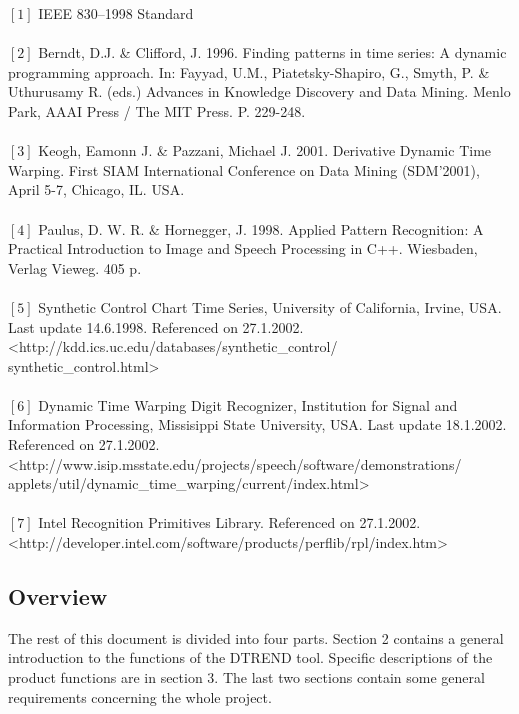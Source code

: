 \documentclass[a4paper,11pt]{article}
\begin{document}
$[1]$ IEEE 830--1998 Standard \\
\\
$[2]$ Berndt, D.J. \& Clifford, J. 1996. Finding patterns in time series: A dynamic programming approach. 
In: Fayyad, U.M., Piatetsky-Shapiro, G., Smyth, P. \& Uthurusamy R. (eds.) Advances in Knowledge Discovery
and Data Mining. Menlo Park, AAAI Press / The MIT Press. P. 229-248. \\
\\
$[3]$ Keogh, Eamonn J. \& Pazzani, Michael J. 2001. Derivative Dynamic Time Warping. First {SIAM} International 
Conference on Data Mining {(SDM'2001)}, April 5-7, Chicago, {IL}. {USA}. \\
\\
$[4]$ Paulus, D. W. R. \& Hornegger, J. 1998. Applied Pattern Recognition: A Practical Introduction to Image and
Speech Processing in C++. Wiesbaden, Verlag Vieweg. 405 p. \\
\\
$[5]$ Synthetic Control Chart Time Series, University of California, Irvine, {USA}. Last update 14.6.1998. Referenced
on 27.1.2002. \\
<http://kdd.ics.uc.edu/databases/synthetic\_control/\\synthetic\_control.html> \\
\\
$[6]$ Dynamic Time Warping Digit Recognizer, Institution for Signal and Information Processing, Missisippi State University, 
{USA}. Last update 18.1.2002. Referenced on 27.1.2002. \\ 
<http://www.isip.msstate.edu/projects/speech/software/demonstrations/\\applets/util/dynamic\_time\_warping/current/index.html> \\
\\
$[7]$ Intel Recognition Primitives Library. Referenced on 27.1.2002. \\ 
<http://developer.intel.com/software/products/perflib/rpl/index.htm>

\subsection{Overview}
The rest of this document is divided into four parts. Section 2 contains a general introduction to the functions of the
DTREND tool. Specific descriptions of the product functions are in section 3. The last two sections contain some general
requirements concerning the whole project.
 
\end{document}

